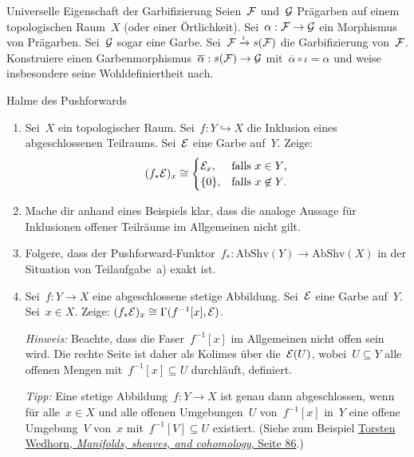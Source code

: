\documentclass{uebblatt}
\begin{document}

\begin{aufgabe}{Universelle Eigenschaft der Garbifizierung}
Seien~$\mathcal{F}$ und~$\mathcal{G}$ Prägarben auf einem topologischen Raum~$X$ (oder einer
Örtlichkeit). Sei~$\alpha : \mathcal{F} \to \mathcal{G}$ ein Morphismus von Prägarben. Sei~$\mathcal{G}$
sogar eine Garbe. Sei~$\mathcal{F} \xrightarrow{\iota} s(\mathcal{F})$ die Garbifizierung von~$\mathcal{F}$.
Konstruiere einen Garbenmorphismus~$\overline{\alpha} : s(\mathcal{F}) \to \mathcal{G}$
mit~$\overline{\alpha} \circ \iota = \alpha$ und weise insbesondere seine
Wohldefiniertheit nach.
\end{aufgabe}

\begin{aufgabe}{Halme des Pushforwards}
\begin{enumerate}
\item Sei~$X$ ein topologischer Raum. Sei~$f : Y \hookrightarrow X$ die
Inklusion eines abgeschlossenen Teilraums. Sei~$\mathcal{E}$ eine Garbe auf~$Y$. Zeige:
\[ (f_* \mathcal{E})_x \cong \begin{cases}
  \mathcal{E}_x, & \text{falls $x \in Y$,} \\
  \{0\}, & \text{falls $x \not\in Y$.}
\end{cases} \]
\item Mache dir anhand eines Beispiels klar, dass die analoge Aussage für
Inklusionen offener Teilräume im Allgemeinen nicht gilt.
\item Folgere, dass der Pushforward-Funktor~$f_* : \mathrm{AbShv}(Y) \to
\mathrm{AbShv}(X)$ in der Situation von Teilaufgabe~a) exakt ist.
\item Sei~$f : Y \to X$ eine abgeschlossene stetige Abbildung. Sei~$\mathcal{E}$ eine
Garbe auf~$Y$. Sei~$x \in X$. Zeige: $(f_* \mathcal{E})_x \cong \Gamma(f^{-1}[x], \mathcal{E})$.

{\tiny\emph{Hinweis:} Beachte, dass die Faser~$f^{-1}[x]$ im Allgemeinen nicht offen
sein wird. Die rechte Seite ist daher als Kolimes über die~$\mathcal{E}(U)$, wobei~$U
\subseteq Y$ alle offenen Mengen mit~$f^{-1}[x] \subseteq U$ durchläuft,
definiert.\par}

{\tiny\emph{Tipp:} Eine stetige Abbildung~$f : Y \to X$ ist genau dann abgeschlossen,
wenn für alle~$x \in X$ und alle offenen Umgebungen~$U$ von~$f^{-1}[x]$ in~$Y$
eine offene Umgebung~$V$ von~$x$ mit~$f^{-1}[V] \subseteq U$ existiert.
(Siehe zum Beispiel
\href{https://www2.math.uni-paderborn.de/fileadmin/Mathematik/People/wedhorn/Lehre/SkriptMannigfaltigkeiten.pdf#page=86}{Torsten
Wedhorn, \emph{Manifolds, sheaves, and cohomology}, Seite 86}.)\par}
\end{enumerate}
\end{aufgabe}
\end{document}
